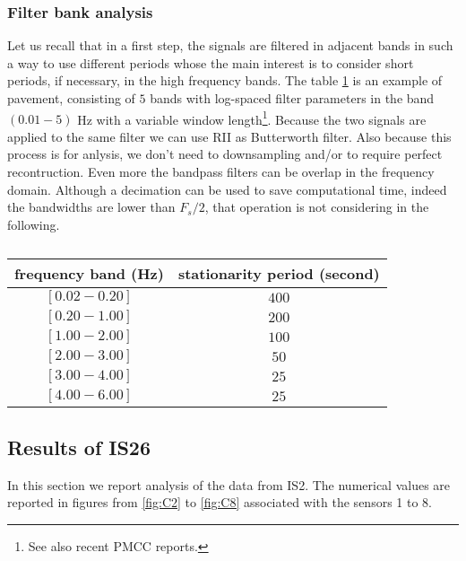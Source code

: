 \subsubsection{Filter bank analysis}
Let us recall that in a first step, the signals are filtered in adjacent bands in such a way to use different periods whose the main interest is to consider short periods, if necessary, in the high frequency bands. The table \ref{tab:freq-duration-tradeoff} is an example of pavement, consisting of $5$ bands with log-spaced filter parameters in the band $(0.01-5)$ Hz with a variable window length\footnote{See also recent PMCC reports.}. Because the two signals are applied to the same filter we can use RII as Butterworth filter. Also because this process is for anlysis, we don't need to downsampling and/or to require perfect recontruction. Even more the bandpass filters can be overlap in the frequency domain. Although a decimation can be used to save computational time, indeed the bandwidths are lower than $F_{s}/2$, that operation is not considering in the following.

\begin{table}
\begin{center}
\begin{tabular}{|c|c|}
\hline
frequency band (Hz) & stationarity period (second)
\\
\hline
$[0.02-0.20]$&$400$
\\ \hline $[0.20-1.00]$&$200$
\\ \hline $[1.00-2.00]$&$100$
\\ \hline $[2.00-3.00]$&$50$
\\ \hline $[3.00-4.00]$&$25$
\\ \hline $[4.00-6.00]$&$25$
\\ \hline 
\end{tabular}
\parbox{12 cm}
{
    \caption{\protect\small\it  }
    \label{tab:freq-duration-tradeoff}
}
\end{center}
\end{table}


\newpage\clearpage

\subsection{Results of IS26}
In this section we report analysis of the data from IS2. The numerical values are reported in figures from \ref{fig:C2} to \ref{fig:C8} associated with the sensors 1 to 8.

